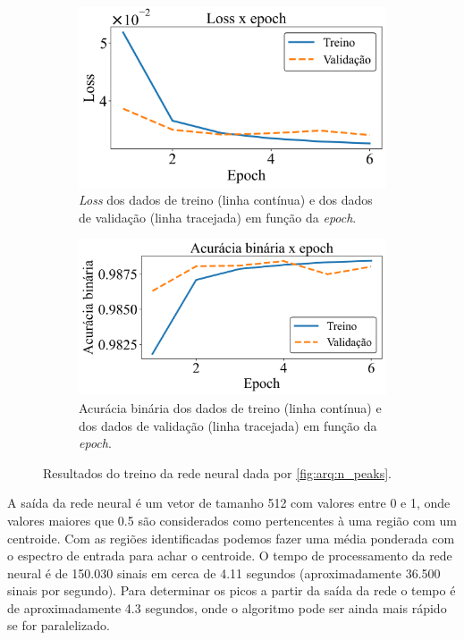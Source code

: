 \documentclass[a4paper,12pt,oneside]{book}
\begin{document}
\begin{figure}[H]
\centering
    \begin{subfigure}[t]{0.49\textwidth}
        \centering
        \includegraphics[scale=0.42]{figs/n_peaks_loss.png}
        \caption{\textit{Loss} dos dados de treino (linha contínua) e dos dados de validação (linha tracejada) em função da \textit{epoch}.}
        \label{subfig:n_peaks_loss}
    \end{subfigure}%
    \hfill
    \begin{subfigure}[t]{0.46\textwidth}
        \centering
        \includegraphics[scale=0.42]{figs/n_peaks_metric.png}
        \caption{Acurácia binária dos dados de treino (linha contínua) e dos dados de validação (linha tracejada) em função da \textit{epoch}.}
        \label{subfig:n_peaks_metric}
    \end{subfigure}
\caption{Resultados do treino da rede neural dada por \ref{fig:arq:n_peaks}.}
\label{fig:n_peaks_results}
\end{figure}

\par A saída da rede neural é um vetor de tamanho 512 com valores entre 0 e 1, onde valores maiores que 0.5 são considerados como pertencentes à uma região com um centroide. Com as regiões identificadas podemos fazer uma média ponderada com o espectro de entrada para achar o centroide. O tempo de processamento da rede neural é de 150.030 sinais em cerca de 4.11 segundos (aproximadamente 36.500 sinais por segundo). Para determinar os picos a partir da saída da rede o tempo é de aproximadamente 4.3 segundos, onde o algoritmo pode ser ainda mais rápido se for paralelizado.
\end{document}
